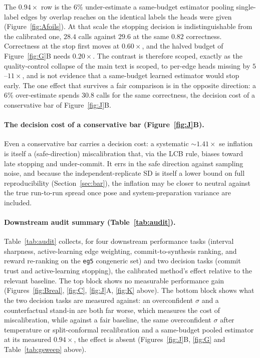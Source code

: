 The $0.94\times$ row is the $6\%$ under-estimate a same-budget estimator pooling single-label
edges by overlap reaches on the identical labels the heads were given (Figure~\ref{fig:Afoils}).
At that scale the stopping decision is indistinguishable from the calibrated one, $28.4$
calls against $29.6$ at the same $0.82$ correctness. Correctness at the stop first moves at
$0.60\times$, and the halved budget of Figure~\ref{fig:G}B needs $0.20\times$. The contrast
is therefore scoped, exactly as the quality-control collapse of the main text is scoped, to
per-edge heads missing by $5$--$11\times$, and is not evidence that a same-budget learned
estimator would stop early. The one effect that survives a fair comparison is in the opposite
direction: a $6\%$ over-estimate spends $30.8$ calls for the same correctness, the decision cost of
a conservative bar of Figure~\ref{fig:J}B.

\paragraph{The decision cost of a conservative bar (Figure~\ref{fig:J}B).}
Even a conservative bar carries a decision cost: a systematic
${\sim}1.41\times$ se inflation is itself a (safe-direction) miscalibration that, via
the LCB rule, biases toward late stopping and under-commit. It errs in the safe direction against
sampling noise, and because the independent-replicate SD is itself a lower bound
on full reproducibility (Section~\ref{sec:bar}), the inflation may be
closer to neutral against the true run-to-run spread once pose and system-preparation variance
are included.

\paragraph{Downstream audit summary (Table~\ref{tab:audit}).} Table~\ref{tab:audit} collects,
for four downstream performance tasks (interval sharpness, active-learning edge weighting,
commit-to-synthesis ranking, and reward re-ranking on the \texttt{eg5} congeneric set) and two
decision tasks (commit trust and active-learning stopping), the calibrated method's effect
relative to the relevant baseline. The top block shows no measurable performance gain
(Figures~\ref{fig:Breal}, \ref{fig:C}, \ref{fig:J}A, \ref{fig:K} above). The bottom block
shows what the two decision tasks are measured against: an overconfident $\sigma$ and a
counterfactual stand-in are both far worse, which measures the cost of miscalibration, while against a fair
baseline, the same overconfident $\sigma$ after temperature or split-conformal
recalibration and a same-budget pooled estimator at its measured $0.94\times$, the effect is
absent (Figures~\ref{fig:J}B, \ref{fig:G} and Table~\ref{tab:gsweep} above).

